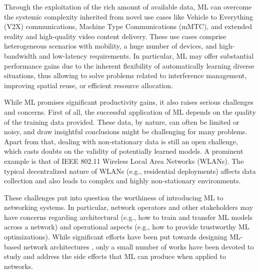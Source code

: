 \documentclass{article}
\begin{document}
	Through the exploitation of the rich amount of available data, ML can overcome the systemic complexity inherited from novel use cases like Vehicle to Everything (V2X) communications, Machine Type Communications (mMTC), and extended reality and high-quality video content delivery. These use cases comprise heterogeneous scenarios with mobility, a huge number of devices, and high-bandwidth and low-latency requirements. In particular, ML may offer substantial performance gains due to the inherent flexibility of automatically learning diverse situations, thus allowing to solve problems related to interference management, improving spatial reuse, or efficient resource allocation.
	
	While ML promises significant productivity gains, it also raises serious challenges and concerns. First of all, the successful application of ML depends on the quality of the training data provided. These data, by nature, can often be limited or noisy, and draw insightful conclusions might be challenging for many problems. Apart from that, dealing with non-stationary data is still an open challenge, which casts doubts on the validity of potentially learned models. A prominent example is that of IEEE 802.11 Wireless Local Area Networks (WLANs). The typical decentralized nature of WLANs (e.g., residential deployments) affects data collection and also leads to complex and highly non-stationary environments.
	
	These challenges put into question the worthiness of introducing ML to networking systems. In particular, network operators and other stakeholders may have concerns regarding architectural (e.g., how to train and transfer ML models across a network) and operational aspects (e.g., how to provide trustworthy ML optimizations). While significant efforts have been put towards designing ML-based network architectures \cite{3gpp2019study, ETSI, ITU3172, ITU3174}, only a small number of works have been devoted to study and address the side effects that ML can produce when applied to networks. 
\end{document}
